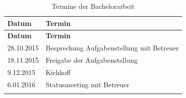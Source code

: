 \begin{longtable}[c]{@{}ll@{}}
\caption{Termine der Bachelorarbeit}\tabularnewline
\toprule
\begin{minipage}[b]{0.16\columnwidth}\raggedright\strut
\textbf{Datum}
\strut\end{minipage} &
\begin{minipage}[b]{0.47\columnwidth}\raggedright\strut
\textbf{Termin}
\strut\end{minipage}\tabularnewline
\midrule
\endfirsthead
\toprule
\begin{minipage}[b]{0.16\columnwidth}\raggedright\strut
\textbf{Datum}
\strut\end{minipage} &
\begin{minipage}[b]{0.47\columnwidth}\raggedright\strut
\textbf{Termin}
\strut\end{minipage}\tabularnewline
\midrule
\endhead
\begin{minipage}[t]{0.16\columnwidth}\raggedright\strut
28.10.2015
\strut\end{minipage} &
\begin{minipage}[t]{0.47\columnwidth}\raggedright\strut
Besprechung Aufgabenstellung mit Betreuer
\strut\end{minipage}\tabularnewline
\begin{minipage}[t]{0.16\columnwidth}\raggedright\strut
18.11.2015
\strut\end{minipage} &
\begin{minipage}[t]{0.47\columnwidth}\raggedright\strut
Freigabe der Aufgabenstellung
\strut\end{minipage}\tabularnewline
\begin{minipage}[t]{0.16\columnwidth}\raggedright\strut
9.12.2015
\strut\end{minipage} &
\begin{minipage}[t]{0.47\columnwidth}\raggedright\strut
Kichkoff
\strut\end{minipage}\tabularnewline
\begin{minipage}[t]{0.16\columnwidth}\raggedright\strut
6.01.2016
\strut\end{minipage} &
\begin{minipage}[t]{0.47\columnwidth}\raggedright\strut
Statusmeeting mit Betreuer
\strut\end{minipage}\tabularnewline
\begin{minipage}[t]{0.16\columnwidth}\raggedright\strut
\strut\end{minipage} &
\begin{minipage}[t]{0.47\columnwidth}\raggedright\strut

\end{minipage}
\end{longtable}
